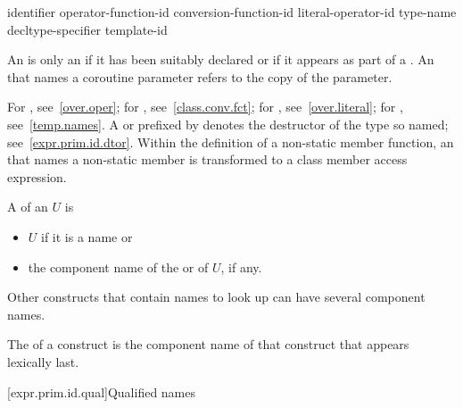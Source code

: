 \documentclass{wg21}
\begin{document}
\begin{bnf}
    \br
    identifier\br
    \br
    operator-function-id\br
    conversion-function-id\br
    literal-operator-id\br
    \terminal{\~} type-name\br
    \terminal{\~} decltype-specifier\br
    \br
    template-id
\end{bnf}

\pnum
{}%
An  is only
an  if it has
been suitably declared
or if it appears as part of a .
An  that names a coroutine parameter
refers to the copy of the parameter.
\begin{note}
    For , see~\ref{over.oper}; for
    , see~\ref{class.conv.fct}; for
    , see~\ref{over.literal}; for
    , see~\ref{temp.names}.
    A   or 
    prefixed by \tcode{\~} denotes the destructor of the type so named;
    see~\ref{expr.prim.id.dtor}.
    Within the definition of a non-static member function, an
     that names a non-static member is transformed to a
    class member access expression.
\end{note}

\pnum
A  of an  $U$ is
\begin{itemize}
    \item
    $U$ if it is a name or
    \item
    the component name of
    the  or  of $U$, if any.
\end{itemize}
\begin{note}
    Other constructs that contain names to look up can have several
    component names.
\end{note}
The  of a construct is
the component name of that construct that appears lexically last.


[expr.prim.id.qual]{Qualified names}
\end{document}
